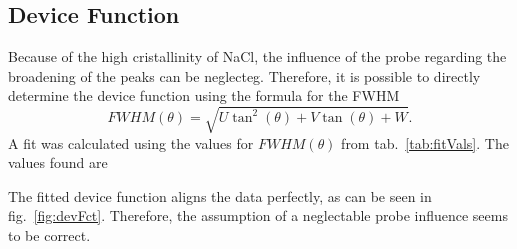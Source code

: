 \subsection*{Device Function}

Because of the high cristallinity of NaCl, the influence of the probe regarding the broadening of the peaks can be neglecteg. Therefore, it is possible to directly determine the device function using the formula for the FWHM 
\begin{equation}
    FWHM(\theta) = \sqrt{U \tan^2(\theta) + V \tan(\theta) + W}.
\end{equation}
A fit was calculated using the values for $FWHM(\theta)$ from tab.~\ref{tab:fitVals}. The values found are \par 
\centerline{} \par
The fitted device function aligns the data perfectly, as can be seen in fig.~\ref{fig:devFct}. Therefore, the assumption of a neglectable probe influence seems to be correct.

